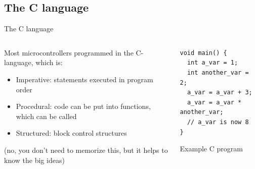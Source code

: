 \documentclass{beamer}
\begin{document}
\subsection{The C language}
\begin{frame}[fragile]{The C language}
  \begin{columns}[T]
    \begin{column}{0.6\textwidth}
      Most microcontrollers programmed in the C-language, which is:
      \begin{itemize}
        \item Imperative: statements executed in program order
        \item Procedural: code can be put into functions, which can be called
        \item Structured: block control structures
      \end{itemize}
      (no, you don't need to memorize this, but it helps to know the big ideas)
    \end{column}

    \begin{column}{0.4\textwidth} \centering
\begin{lstlisting}[tabsize=2,basicstyle=\ttfamily\scriptsize]
void main() {
  int a_var = 1;
  int another_var = 2;
  a_var = a_var + 3;
  a_var = a_var * another_var;
  // a_var is now 8
} \end{lstlisting} 
Example C program
    \end{column}
  \end{columns}
\end{frame}
\end{document}
